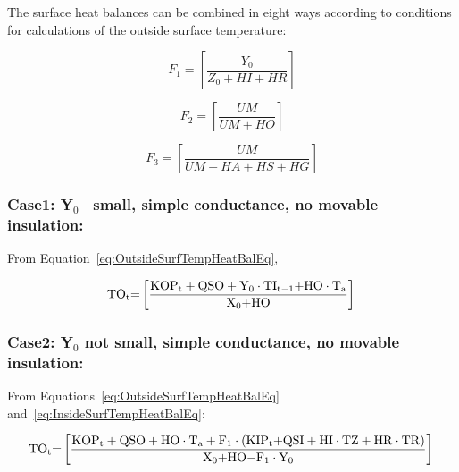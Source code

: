 The surface heat balances can be combined in eight ways according to conditions for calculations of the outside surface temperature:

\begin{equation}
{F_1} = \left[ {\frac{{{Y_0}}}{{{Z_0} + HI + HR}}} \right]
\end{equation}

\begin{equation}
{F_2} = \left[ {\frac{{UM}}{{UM + HO}}} \right]
\end{equation}

\begin{equation}
{F_3} = \left[ {\frac{{UM}}{{UM + HA + HS + HG}}} \right]
\end{equation}

\subsubsection{Case1: Y\(_{0}\)~ small, simple conductance, no movable insulation:}\label{case1-yux5f0-small-simple-conductance-no-movable-insulation}

From Equation~\ref{eq:OutsideSurfTempHeatBalEq},

\begin{equation}
{\rm{T}}{{\rm{O}}_{\rm{t}}}{\rm{ = }}\left[ {\frac{{{\rm{KO}}{{\rm{P}}_{\rm{t}}} + {\rm{QSO}} + {{\rm{Y}}_0}\cdot {\rm{T}}{{\rm{I}}_{{\rm{t - 1}}}}{\rm{ + HO}}\cdot {{\rm{T}}_{\rm{a}}}}}{{{{\rm{X}}_{\rm{0}}}{\rm{ + HO}}}}} \right]{\rm{  }}
\end{equation}

\subsubsection{Case2: Y\(_{0}\) not small, simple conductance, no movable insulation:}\label{case2-yux5f0-not-small-simple-conductance-no-movable-insulation}

From Equations~\ref{eq:OutsideSurfTempHeatBalEq} and~\ref{eq:InsideSurfTempHeatBalEq}:

\begin{equation}
{\rm{T}}{{\rm{O}}_{\rm{t}}}{\rm{ = }}\left[ {\frac{{{\rm{KO}}{{\rm{P}}_{\rm{t}}} + {\rm{QSO}} + {\rm{HO}}\cdot {{\rm{T}}_{\rm{a}}} + {{\rm{F}}_1}\cdot \left( {{\rm{KI}}{{\rm{P}}_{\rm{t}}}{\rm{ + QSI + HI}}\cdot {\rm{TZ + HR}}\cdot {\rm{TR}}} \right)}}{{{{\rm{X}}_{\rm{0}}}{\rm{ + HO - }}{{\rm{F}}_{\rm{1}}}\cdot {{\rm{Y}}_0}}}} \right]{\rm{  }}
\end{equation}

